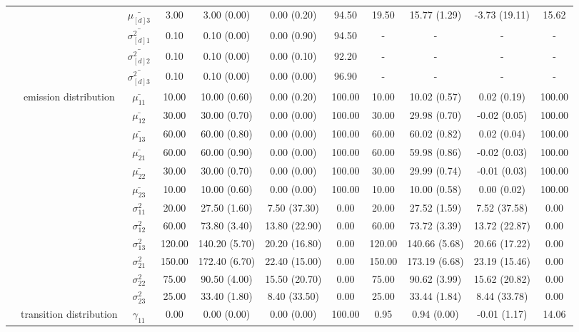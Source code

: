 \begin{table}[h]
{\begin{tabular}{ccccccccccc}
 &  & $\bar{\mu_{[d]3}}$ & 3.00 & 3.00 (0.00) & 0.00 (0.20) & 94.50 & 19.50 & 15.77 (1.29) & -3.73 (19.11) & 15.62 \\
 &  & $\bar{\sigma^2_{[d]1}}$ & 0.10 & 0.10 (0.00) & 0.00 (0.90) & 94.50 & - & - & - & - \\
 &  & $\bar{\sigma^2_{[d]2}}$ & 0.10 & 0.10 (0.00) & 0.00 (0.10) & 92.20 & - & - & - & - \\
 &  & $\bar{\sigma^2_{[d]3}}$ & 0.10 & 0.10 (0.00) & 0.00 (0.00) & 96.90 & - & - & - & - \\
 & emission distribution & $\bar{\mu_{11}}$ & 10.00 & 10.00 (0.60) & 0.00 (0.20) & 100.00 & 10.00 & 10.02 (0.57) & 0.02 (0.19) & 100.00 \\
 & \multirow{11}{*}{} & $\bar{\mu_{12}}$ & 30.00 & 30.00 (0.70) & 0.00 (0.00) & 100.00 & 30.00 & 29.98 (0.70) & -0.02 (0.05) & 100.00 \\
 &  & $\bar{\mu_{13}}$ & 60.00 & 60.00 (0.80) & 0.00 (0.00) & 100.00 & 60.00 & 60.02 (0.82) & 0.02 (0.04) & 100.00 \\
 &  & $\bar{\mu_{21}}$ & 60.00 & 60.00 (0.90) & 0.00 (0.00) & 100.00 & 60.00 & 59.98 (0.86) & -0.02 (0.03) & 100.00 \\
 &  & $\bar{\mu_{22}}$ & 30.00 & 30.00 (0.70) & 0.00 (0.00) & 100.00 & 30.00 & 29.99 (0.74) & -0.01 (0.03) & 100.00 \\
 &  & $\bar{\mu_{23}}$ & 10.00 & 10.00 (0.60) & 0.00 (0.00) & 100.00 & 10.00 & 10.00 (0.58) & 0.00 (0.02) & 100.00 \\
 &  & $\sigma^2_{11}$ & 20.00 & 27.50 (1.60) & 7.50 (37.30) & 0.00 & 20.00 & 27.52 (1.59) & 7.52 (37.58) & 0.00 \\
 &  & $\sigma^2_{12}$ & 60.00 & 73.80 (3.40) & 13.80 (22.90) & 0.00 & 60.00 & 73.72 (3.39) & 13.72 (22.87) & 0.00 \\
 &  & $\sigma^2_{13}$ & 120.00 & 140.20 (5.70) & 20.20 (16.80) & 0.00 & 120.00 & 140.66 (5.68) & 20.66 (17.22) & 0.00 \\
 &  & $\sigma^2_{21}$ & 150.00 & 172.40 (6.70) & 22.40 (15.00) & 0.00 & 150.00 & 173.19 (6.68) & 23.19 (15.46) & 0.00 \\
 &  & $\sigma^2_{22}$ & 75.00 & 90.50 (4.00) & 15.50 (20.70) & 0.00 & 75.00 & 90.62 (3.99) & 15.62 (20.82) & 0.00 \\
 &  & $\sigma^2_{23}$ & 25.00 & 33.40 (1.80) & 8.40 (33.50) & 0.00 & 25.00 & 33.44 (1.84) & 8.44 (33.78) & 0.00 \\
 & transition distribution & $\gamma_{11}$ & 0.00 & 0.00 (0.00) & 0.00 (0.00) & 100.00 & 0.95 & 0.94 (0.00) & -0.01 (1.17) & 14.06 \\

\end{tabular}}
\end{table}
